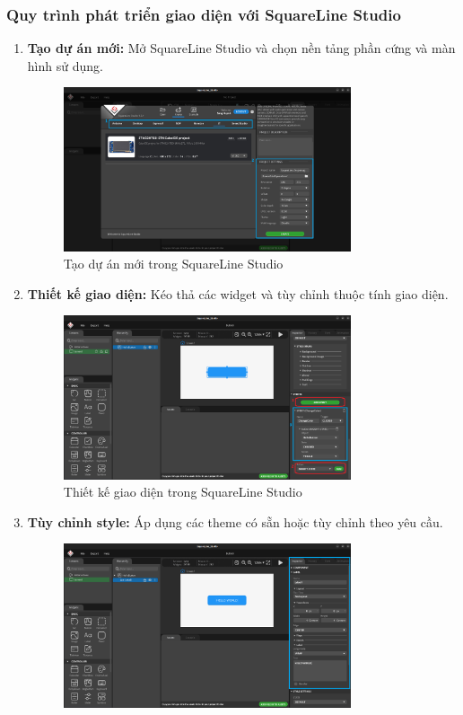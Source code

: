 \subsubsection{Quy trình phát triển giao diện với SquareLine Studio}
\begin{enumerate}
  \item \textbf{Tạo dự án mới:} Mở SquareLine Studio và chọn nền tảng phần cứng và màn hình sử dụng.\\
  \begin{figure}[H]
    \centering
    \includegraphics[width=0.8\textwidth]{Images/new-project.png}
    \caption{Tạo dự án mới trong SquareLine Studio}
  \end{figure}
  \item \textbf{Thiết kế giao diện:} Kéo thả các widget và tùy chỉnh thuộc tính giao diện.
  \begin{figure}[H]
    \centering
    \includegraphics[width=0.8\textwidth]{Images/thiet-ke-giao-dien.png}
    \caption{Thiết kế giao diện trong SquareLine Studio}
  \end{figure}
  \item \textbf{Tùy chỉnh style:} Áp dụng các theme có sẵn hoặc tùy chỉnh theo yêu cầu.
  \begin{figure}[H]
    \centering
    \includegraphics[width=0.8\textwidth]{Images/custom-style.png}

\end{figure}
\end{enumerate}

